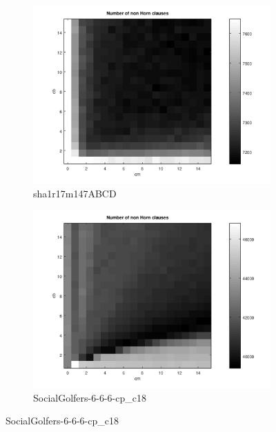 \documentclass[12pt,a4paper]{article}
\begin{document}
\begin{figure}[H]\ContinuedFloat 
  \centering 
  \begin{subfigure}{0.45\textwidth}
    \includegraphics[width=\textwidth]{probSAT/probSATexp_sha1r17m147ABCD[SKIP=0].png}
    \caption{sha1r17m147ABCD}
  \end{subfigure}
  \begin{subfigure}{0.45\textwidth}
    \includegraphics[width=\textwidth]{probSAT/probSATexp_SocialGolfers-6-6-6-cp_c18[SKIP=0].png}
    \caption{SocialGolfers-6-6-6-cp\_c18}
  \end{subfigure}


\end{figure}
\end{document}
